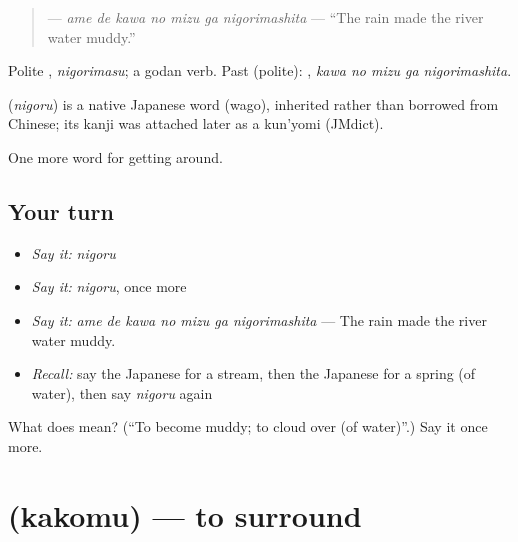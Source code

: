 \begin{quote}
\textbf{   } — \emph{ame de kawa no mizu ga nigorimashita} — \textquotedblleft{}The rain made the river water muddy.\textquotedblright{}
\end{quote}

Polite \textbf{}, \emph{nigorimasu}; a godan verb. Past (polite): \textbf{  }, \emph{kawa no mizu ga nigorimashita}.

\begin{cousinweb}
\textbf{} (\emph{nigoru}) is a native Japanese word (wago), inherited rather than borrowed from Chinese; its kanji was attached later as a kun'yomi (JMdict).
\end{cousinweb}

\begin{grammarlens}[title={What you've built}]
One more word for getting around.
\end{grammarlens}

\subsection*{Your turn}
\begin{itemize}
\raggedright
  \item \emph{Say it:} \emph{nigoru}
  \item \emph{Say it:} \emph{nigoru}, once more
  \item \emph{Say it:} \emph{ame de kawa no mizu ga nigorimashita} — The rain made the river water muddy.
  \item \emph{Recall:} say the Japanese for a stream, then the Japanese for a spring (of water), then say \emph{nigoru} again
\end{itemize}

\begin{tcolorbox}[breakable,colback=teal!4,colframe=teal!35!black,title={Before you move on}]
What does  mean? (\textquotedblleft{}To become muddy; to cloud over (of water)\textquotedblright{}.) Say it once more.
\end{tcolorbox}
\section[\texorpdfstring{\ja{かこむ} (kakomu)}{かこむ (kakomu)}]{ (kakomu) — to surround}

\label{lesson:JA-C411-kakomu}




